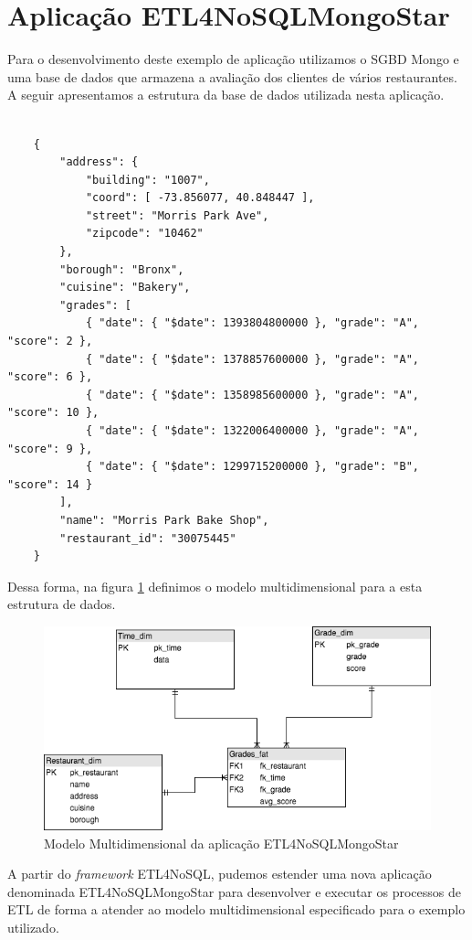 \section{Aplicação ETL4NoSQLMongoStar}

Para o desenvolvimento deste exemplo de aplicação utilizamos o SGBD Mongo e uma base de dados que armazena a avaliação dos clientes de vários restaurantes. A seguir apresentamos a estrutura da base de dados utilizada nesta aplicação.

\begin{lstlisting}[frame=single, language=Oberon-2, basicstyle=\tiny]

	{
		"address": {
			"building": "1007",
			"coord": [ -73.856077, 40.848447 ],
			"street": "Morris Park Ave",
			"zipcode": "10462"
		},
		"borough": "Bronx",
		"cuisine": "Bakery",
		"grades": [
			{ "date": { "$date": 1393804800000 }, "grade": "A", "score": 2 },
			{ "date": { "$date": 1378857600000 }, "grade": "A", "score": 6 },
			{ "date": { "$date": 1358985600000 }, "grade": "A", "score": 10 },
			{ "date": { "$date": 1322006400000 }, "grade": "A", "score": 9 },
			{ "date": { "$date": 1299715200000 }, "grade": "B", "score": 14 }
		],
		"name": "Morris Park Bake Shop",
		"restaurant_id": "30075445"
	}

\end{lstlisting}  

Dessa forma, na figura \ref{mongomultidim} definimos o modelo multidimensional para a esta estrutura de dados.

\begin{figure}[h!]
	\centering
	\includegraphics[scale=0.5]{fig/mongo_multidim.png}
	\caption{Modelo Multidimensional da aplicação ETL4NoSQLMongoStar}
	\label{mongomultidim}
\end{figure}

A partir do \textit{framework} ETL4NoSQL, pudemos estender uma nova aplicação denominada ETL4NoSQLMongoStar para desenvolver e executar os processos de ETL de forma a atender ao modelo multidimensional especificado para o exemplo utilizado.

